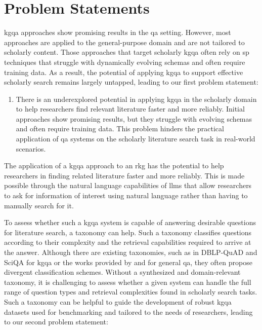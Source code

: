 
\section{Problem Statements}
\label{sec:problem_statements}

\gls{kgqa} approaches show promising results in the \gls{qa} setting. However, most approaches are applied to the general-purpose domain and are not tailored to scholarly content. Those approaches that target scholarly \gls{kgqa} often rely on \gls{sp} techniques that struggle with dynamically evolving schemas and often require training data. As a result, the potential of applying \gls{kgqa} to support effective scholarly search remains largely untapped, leading to our first problem statement:

\begin{enumerate}[label=\textbf{P\arabic*}, leftmargin=2.5em]
    \item \label{enum:p1} There is an underexplored potential in applying \gls{kgqa} in the scholarly domain to help researchers find relevant literature faster and more reliably. Initial approaches show promising results, but they struggle with evolving schemas and often require training data. This problem hinders the practical application of \gls{qa} systems on the scholarly literature search task in real-world scenarios. 
\end{enumerate}

The application of a \gls{kgqa} approach to an \gls{rkg} has the potential to help researchers in finding related literature faster and more reliably. This is made possible through the natural language capabilities of \glspl{llm} that allow researchers to ask for information of interest using natural language rather than having to manually search for it. 

To assess whether such a \gls{kgqa} system is capable of answering desirable questions for literature search, a taxonomy can help. Such a taxonomy classifies questions according to their complexity and the retrieval capabilities required to arrive at the answer. Although there are existing taxonomies, such as in DBLP-QuAD \cite{banerjee_dblp-quad_2023} and SciQA \cite{dubey_lc-quad_2019} for \gls{kgqa} or the works provided by \textcite{li_learning_2002} and \textcite{singhal_att_1999} for general \gls{qa}, they often propose divergent classification schemes. Without a synthesized and domain-relevant taxonomy, it is challenging to assess whether a given system can handle the full range of question types and retrieval complexities found in scholarly search tasks. Such a taxonomy can be helpful to guide the development of robust \gls{kgqa} datasets used for benchmarking and tailored to the needs of researchers, leading to our second problem statement:

